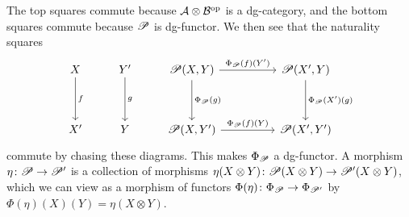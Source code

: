 \documentclass[dissertation.tex]{subfiles}
\begin{document}
\begin{rmk}
  The top squares commute because $\mathcal{A} \otimes \mathcal{B}^{\operatorname{op}}$ is a dg-category, and the bottom squares commute because $\mathscr{P}$ is dg-functor.
  We then see that the naturality squares
  $$\begin{tikzcd}
    X \arrow{dd}{f} & Y^\prime \arrow{dd}{g} & \funct{P}(X,Y) \arrow{rr}{\Phi_{\funct{P}}(f)(Y^\prime)}\arrow{dd}{\Phi_{\funct{P}}(g)} && \funct{P}(X^\prime, Y)\arrow{dd}{\Phi_{\funct{P}}(X^\prime)(g)}\\
    \\
    X^\prime & Y & \funct{P}(X,Y^\prime) \arrow{rr}{\Phi_{\funct{P}}(f)(Y)} && \funct{P}(X^\prime,Y^\prime)
  \end{tikzcd}$$
  commute by chasing these diagrams.
  This makes $\Phi_{\mathscr{P}}$ a dg-functor.
  A morphism $\eta \colon \mathscr{P} \to \mathscr{P}^\prime$ is a collection of morphisms $\eta(X \otimes Y) \colon \mathscr{P}(X \otimes Y) \to \mathscr{P}^\prime(X \otimes Y)$, which we can view as a morphism of functors $\Phi(\eta) \colon \Phi_{\mathscr{P}} \to \Phi_{\mathscr{P}^\prime}$ by $\Phi(\eta)(X)(Y) = \eta(X \otimes Y)$.


\end{rmk}
\end{document}

